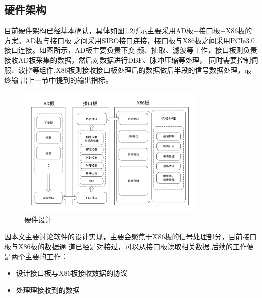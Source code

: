 \documentclass[a4paper,12pt]{report}
\begin{document}
\begin{spacing}{1.5}
\section{硬件架构}
目前硬件架构已经基本确认，具体如图1.2所示主要采用AD板+接口板+X86板的方案。AD板与接口板
之间采用SIRO接口连接，接口板与X86板之间采用PCIe3.0接口连接。如图所示，AD板主要负责下变
频、抽取、滤波等工作，接口板则负责接收AD板采集的数据，然后对数据进行DBF、脉冲压缩等处理，
同时需要控制伺服、波控等组件,X86板则接收接口板处理后的数据做后半段的信号数据处理，最终输
出上一节中提到的输出指标。
\begin{figure}[hbtp]
    \centering
    \includegraphics [width=0.8\textwidth]{figure//HardDesign.pdf}
    \caption{硬件设计}\label{HardDesign}
\end{figure}

因本文主要讨论软件的设计实现，主要会聚焦于X86板的信号处理部分，目前接口板与X86板的数据通
道已经是对接过，可以从接口板读取相关数据,后续的工作便是两个主要的工作：
\begin{itemize}
    \itemsep=3pt
    \parskip=0pt
    \setlength{\itemindent}{1em}
    \item 设计接口板与X86板接收数据的协议
    \item 处理理接收到的数据
\end{itemize}


%
%

\end{spacing}
\end{document}
